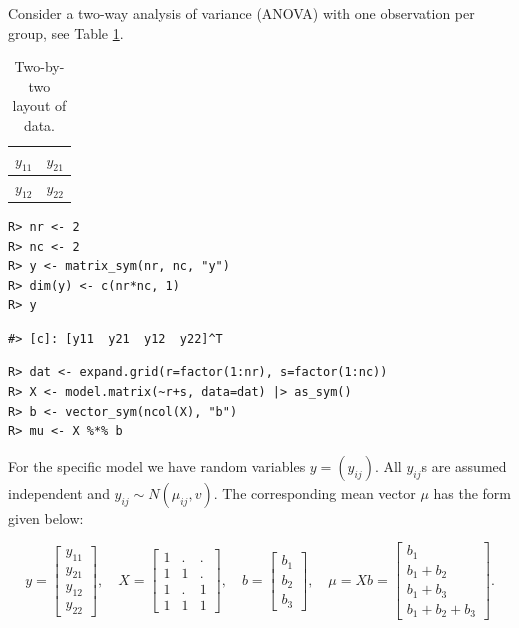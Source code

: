Consider a two-way analysis of variance (ANOVA) with one observation
per group, see Table \ref{tab:anova-two-way-table}.

\begin{table}[!h]

\caption{\label{tab:anova-two-way-table}Two-by-two layout of data.}
\centering
\begin{tabular}[t]{|>{}l|>{}l|}
\hline
$y_{11}$ & $y_{21}$\\
\hline
$y_{12}$ & $y_{22}$\\
\hline
\end{tabular}
\end{table}

\begin{verbatim}
R> nr <- 2
R> nc <- 2
R> y <- matrix_sym(nr, nc, "y")
R> dim(y) <- c(nr*nc, 1)
R> y
\end{verbatim}

\begin{verbatim}
#> [c]: [y11  y21  y12  y22]^T
\end{verbatim}

\begin{verbatim}
R> dat <- expand.grid(r=factor(1:nr), s=factor(1:nc))
R> X <- model.matrix(~r+s, data=dat) |> as_sym()
R> b <- vector_sym(ncol(X), "b")
R> mu <- X %*% b
\end{verbatim}

For the specific model we have random variables \(y=(y_{ij})\). All \(y_{ij}\)s are assumed independent and \(y_{ij}\sim N(\mu_{ij}, v)\).
The corresponding mean vector \(\mu\) has the form given below:

\[
y = \left[\begin{matrix}y_{11}\\y_{21}\\y_{12}\\y_{22}\end{matrix}\right], \quad X=\left[\begin{matrix}1 & . & .\\1 & 1 & .\\1 & . & 1\\1 & 1 & 1\end{matrix}\right], \quad b=\left[\begin{matrix}b_{1}\\b_{2}\\b_{3}\end{matrix}\right], \quad  \mu = X b = \left[\begin{matrix}b_{1}\\b_{1} + b_{2}\\b_{1} + b_{3}\\b_{1} + b_{2} + b_{3}\end{matrix}\right] .
\]

